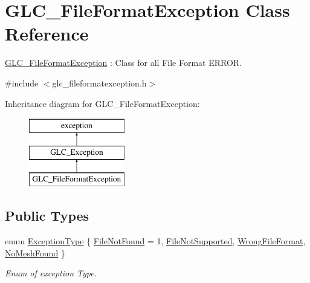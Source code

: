 \hypertarget{class_g_l_c___file_format_exception}{\section{G\-L\-C\-\_\-\-File\-Format\-Exception Class Reference}
\label{class_g_l_c___file_format_exception}
}


\hyperlink{class_g_l_c___file_format_exception}{G\-L\-C\-\_\-\-File\-Format\-Exception} \-: Class for all File Format E\-R\-R\-O\-R.  




{\ttfamily \#include $<$glc\-\_\-fileformatexception.\-h$>$}

Inheritance diagram for G\-L\-C\-\_\-\-File\-Format\-Exception\-:\begin{figure}[H]
\begin{center}
\leavevmode
\includegraphics[height=3.000000cm]{class_g_l_c___file_format_exception}
\end{center}
\end{figure}
\subsection*{Public Types}
\begin{DoxyCompactItemize}
\item 
enum \hyperlink{class_g_l_c___file_format_exception_ab28c5be439dcc7226f9fa041ff87dc18}{Exception\-Type} \{ \hyperlink{class_g_l_c___file_format_exception_ab28c5be439dcc7226f9fa041ff87dc18acd0f8232d11141fc90b792349eb25a55}{File\-Not\-Found} = 1, 
\hyperlink{class_g_l_c___file_format_exception_ab28c5be439dcc7226f9fa041ff87dc18a25b68d2ee7154688bbbd067e509e8858}{File\-Not\-Supported}, 
\hyperlink{class_g_l_c___file_format_exception_ab28c5be439dcc7226f9fa041ff87dc18a70dc4c982fe4e20a2608a59d8c0db287}{Wrong\-File\-Format}, 
\hyperlink{class_g_l_c___file_format_exception_ab28c5be439dcc7226f9fa041ff87dc18a53f567abeee10767689dc88864a43dd8}{No\-Mesh\-Found}
 \}
\begin{DoxyCompactList}\small\item\em Enum of exception Type. \end{DoxyCompactList}\end{DoxyCompactItemize}
